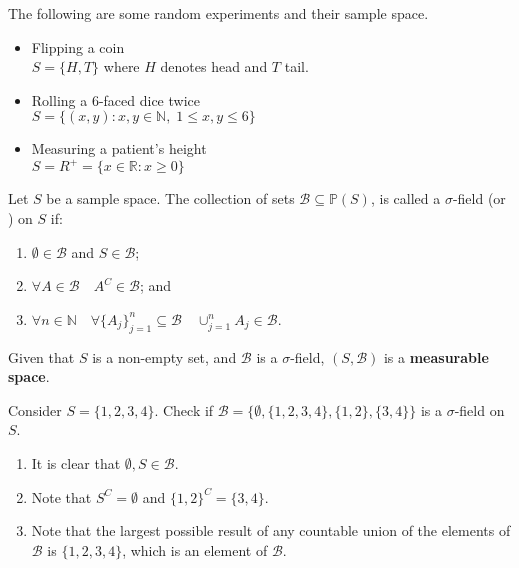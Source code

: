 \documentclass[notoc,notitlepage]{tufte-book}
\begin{document}
\begin{eg}
  \label{eg:sample_space_eg}
  The following are some random experiments and their sample space.
  \begin{itemize}
    \item Flipping a coin\\
      $S = \{H, T\}$ where $H$ denotes head and $T$ tail.
    \item Rolling a 6-faced dice twice\\
      $S = \{(x, y) : x, y \in \mathbb{N}, \; 1 \leq x, y \leq 6 \}$
    \item Measuring a patient's height\\
      $S = R^+ = \{x \in \mathbb{R} : x \geq 0\}$
  \end{itemize}
\end{eg}

\begin{defn}\label{defn:sigma_field}
  Let $S$ be a sample space. The collection of sets $\mathscr{B} \subseteq \mathbb{P}(S)$, is called a $\sigma$-field (or ) on $S$ if:
  \begin{enumerate}
    \item $\emptyset \in \mathscr{B}$ and $S \in \mathscr{B}$;
    \item $\forall A \in \mathscr{B} \quad A^C \in \mathscr{B}$;  and
    \item $\forall n \in \mathbb{N} \quad \forall \{A_j\}_{j = 1}^{n} \subseteq \mathscr{B} \quad \cup_{j=1}^{n} A_j \in \mathscr{B}$.
  \end{enumerate}
\end{defn}

\begin{defn}\label{defn:measurable_space}
  Given that $S$ is a non-empty set, and $\mathscr{B}$ is a $\sigma$-field, $(S, \mathscr{B})$ is a \textbf{measurable space}.
\end{defn}

\begin{eg}
  \label{eg:sigma_field_eg}
  Consider $S = \{1, 2, 3, 4\}$. Check if $\mathscr{B} = \{\emptyset, \{1, 2, 3, 4\}, \{1, 2\}, \{3, 4\} \}$ is a $\sigma$-field on $S$.
  \begin{enumerate}
    \item It is clear that $\emptyset, S \in \mathscr{B}$.
    \item Note that $S^C = \emptyset$ and $\{1, 2\}^C = \{3, 4\}$.
    \item Note that the largest possible result of any countable union of the elements of $\mathscr{B}$ is $\{1, 2, 3, 4\}$, which is an element of $\mathscr{B}$.
  \end{enumerate}
\end{eg}
\end{document}

